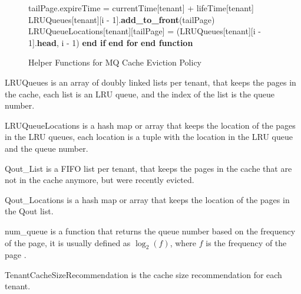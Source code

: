 \begin{figure}[htbp]
\begin{minipage}{\linewidth}
\begin{algorithm}[H]
\begin{algorithmic}
            \STATE \hspace{\algorithmicindent} \hspace{\algorithmicindent} \hspace{\algorithmicindent} tailPage.expireTime = currentTime[tenant] + lifeTime[tenant]
            \STATE \hspace{\algorithmicindent} \hspace{\algorithmicindent} \hspace{\algorithmicindent} LRUQueues[tenant][i - 1].\textbf{add\_to\_front}(tailPage)
            \STATE \hspace{\algorithmicindent} \hspace{\algorithmicindent} \hspace{\algorithmicindent} LRUQueueLocations[tenant][tailPage] = (LRUQueues[tenant][i - 1].\textbf{head}, i - 1)
            \STATE \hspace{\algorithmicindent} \hspace{\algorithmicindent} \textbf{end if}
            \STATE \hspace{\algorithmicindent} \textbf{end for}
            \STATE \textbf{end function}
        \end{algorithmic}
    \end{algorithm}
    \caption{Helper Functions for MQ Cache Eviction Policy}
    \label{fig:mq-helper}
    \end{minipage}
\end{figure}

LRUQueues is an array of doubly linked lists per tenant, that keeps the pages in the cache,
each list is an LRU queue, and the index of the list is the queue number.

LRUQueueLocations is a hash map or array that keeps the location of the pages in the LRU queues,
each location is a tuple with the location in the LRU queue and the queue number.

Qout\_List is a FIFO list per tenant, that keeps the pages in the cache that are not in the cache
anymore, but were recently evicted.

Qout\_Locations is a hash map or array that keeps the location of the pages in the Qout list.

num\_queue is a function that returns the queue number based on the frequency of the page,
it is usually defined as $\log_2(f)$, where $f$ is the frequency of the page \cite{mq-article}.

TenantCacheSizeRecommendation is the cache size recommendation for each tenant.

